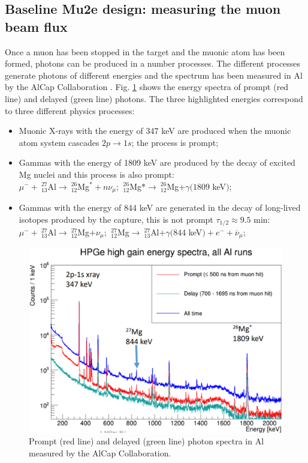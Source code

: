 \documentclass[12pt,a4paper,openright, oneside, titlepage]{book} %
\begin{document}
\subsection{Baseline Mu2e design: measuring the muon beam flux}\label{sec:STM}
Once a muon has been stopped in the target and the muonic atom has been formed, photons can be produced in a number processes. 
The different processes generate photons of different energies and the spectrum has been measured in Al by the AlCap Collaboration \cite{AlCap:2015}.
Fig. \ref{_HPG_Spectra} shows the energy spectra of prompt (red line) and delayed (green line) photons.
The three highlighted energies correspond to three different physics processes:
\begin{itemize}
\item Muonic X-rays with the energy of 347 keV are produced when the muonic atom system cascades $2p\rightarrow 1s$; 
the process is prompt;
\item Gammas with the energy of 1809 keV are produced by the decay of excited Mg nuclei and this process is also prompt:\\
$\mu^-+\ _{13}^{27}$Al$\rightarrow \ _{12}^{26}$Mg$^*+n\nu_\mu$; $\ _{12}^{26}$Mg$*\rightarrow \ _{12}^{26}$Mg$+\gamma(1809$ keV$)$;
\item Gammas with the energy of 844 keV are generated in the decay of long-lived isotopes produced by the capture, this is not prompt $\tau_{1/2}\approx9.5$ min:\\
$\mu^-+\ _{13}^{27}$Al$\rightarrow \ _{12}^{27}$Mg$+\nu_\mu$; $\ _{12}^{27}$Mg$\rightarrow \ _{13}^{27}$Al$+\gamma(844$ keV$)+e^-+\overline{\nu}_\mu$;\\
\end{itemize}

\begin{figure}[h!]
\centering
\includegraphics[scale=0.6]{HPG_Spectra}
\caption[Photons spectrum from stopped muons]{Prompt (red line) and delayed (green line)  
photon spectra in Al measured by the AlCap Collaboration.}
\label{_HPG_Spectra}
\end{figure}
\end{document}
